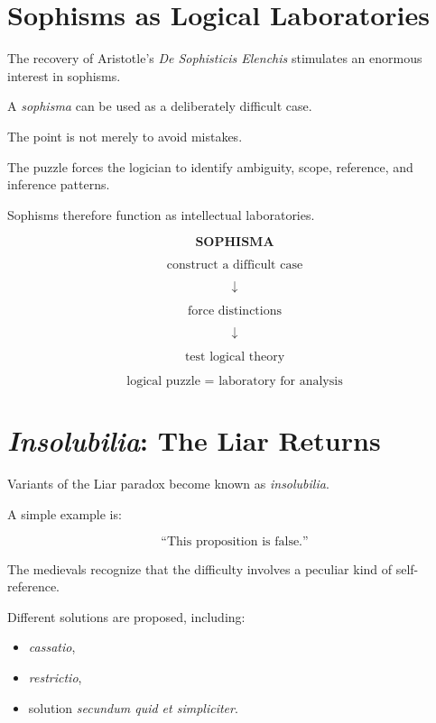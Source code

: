 \documentclass[11pt]{article}
\newcommand{\latin}[1]{\textit{#1}}
\begin{document}
\section{Sophisms as Logical Laboratories}

The recovery of Aristotle's \textit{De Sophisticis Elenchis}
stimulates an enormous interest in sophisms.

A \latin{sophisma} can be used as a deliberately difficult case.

The point is not merely to avoid mistakes.

The puzzle forces the logician to identify ambiguity, scope,
reference, and inference patterns.

Sophisms therefore function as intellectual laboratories.

\begin{whiteboard}
\[
\textbf{SOPHISMA}
\]

\[
\text{construct a difficult case}
\]

\[
\downarrow
\]

\[
\text{force distinctions}
\]

\[
\downarrow
\]

\[
\text{test logical theory}
\]

\[
\boxed{\text{logical puzzle = laboratory for analysis}}
\]
\end{whiteboard}

\section{\textit{Insolubilia}: The Liar Returns}

Variants of the Liar paradox become known as
\latin{insolubilia}.

A simple example is:

\[
\text{``This proposition is false.''}
\]

The medievals recognize that the difficulty involves a peculiar
kind of self-reference.

Different solutions are proposed, including:

\begin{itemize}
    \item \latin{cassatio},
    \item \latin{restrictio},
    \item solution \latin{secundum quid et simpliciter}.
\end{itemize}
\end{document}
